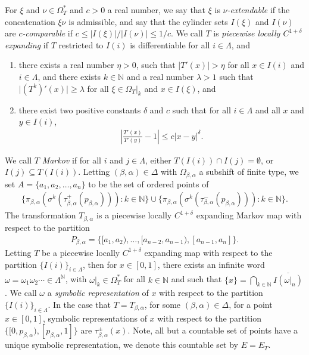 \documentclass[a4paper,reqno,10pt]{amsart}
\begin{document}
For $\xi$ and $\nu \in \Omega_{T}^{*}$ and $c > 0$ a real number, we say that $\xi$ is \textsl{$\nu$-extendable} if the concatenation $\xi\nu$ is admissible, and say that the cylinder sets $I(\xi)$ and $I(\nu)$ are \textsl{$c$-comparable} if $c \leq \lvert I(\xi) \rvert / \lvert I(\nu) \rvert \leq 1/c$. We call $T$ is \textsl{piecewise locally $C^{1+\delta}$ expanding} if $T$ restricted to $I(i)$ is differentiable for all $i \in \Lambda$, and
    \begin{enumerate}[label={\rm(\arabic*)}]
        \item there exists a real number $\eta > 0$, such that $\lvert T'(x) \rvert > \eta$ for all $x \in I(i)$ and $i \in \Lambda$, and there exists $k \in \mathbb{N}$ and a real number $\lambda > 1$ such that $\lvert (T^{k})'(x) \rvert \geq \lambda$ for all $\xi \in \Omega_{T}\vert_{k}$ and $x \in I(\xi)$, and
        \item there exist two positive constants $\delta$ and $c$ such that for all $i \in \Lambda$ and all $x$ and $y \in I(i)$,
            \begin{align*}
                \left\lvert \frac{T'(x)}{T'(y)} - 1 \right\rvert \leq c \lvert x - y \rvert^{\delta}. 
            \end{align*}
    \end{enumerate}
We call $T$ \textsl{Markov} if for all $i$ and $j \in \Lambda$, either $T(I(i)) \cap I(j) = \emptyset$, or $I(j) \subseteq T(I(i))$. Letting $(\beta, \alpha) \in \Delta$ with $\Omega_{\beta, \alpha}$ a subshift of finite type, we set $A = \{ a_{1}, a_{2}, \ldots, a_{n} \}$ to be the set of ordered points of 
    \begin{align*}
        \{ \pi_{\beta, \alpha}(\sigma^{k}(\tau_{\beta,\alpha}^{+}(p_{\beta, \alpha}))) \colon k \in \mathbb{N}\} \cup \{ \pi_{\beta, \alpha}(\sigma^{k}(\tau_{\beta,\alpha}^{-}(p_{\beta, \alpha}))) \colon k \in \mathbb{N} \}.
    \end{align*}
The transformation $T_{\beta, \alpha}$ is a piecewise locally $C^{1+\delta}$ expanding Markov map with respect to the partition 
    \begin{align}\label{eq:Markov_Partition}
        P_{\beta,\alpha} = \{[a_{1}, a_{2}), \ldots, [a_{n-2}, a_{n-1}), [a_{n-1}, a_{n}]\}.
    \end{align}
Letting $T$ be a piecewise locally $C^{1+\delta}$ expanding map with respect to the partition $\{ I(i) \}_{i \in \Lambda}$, then for $x \in [0, 1]$, there exists an infinite word $\omega = \omega_{1} \omega_{2} \cdots  \in \Lambda^{\mathbb{N}}$, with $\omega \vert_{k} \in \Omega_{T}^{*}$ for all $k \in \mathbb{N}$ and such that $\{ x \} = \bigcap_{k \in \mathbb{N}} \overline{I(\omega\vert_{n})}$. We call $\omega$ a \textsl{symbolic representation} of $x$ with respect to the partition $\{ I(i)\}_{i \in \Lambda}$.  In the case that $T = T_{\beta,\alpha}$, for some $(\beta,\alpha) \in \Delta$, for a point $x \in [0, 1]$, symbolic representations of $x$ with respect to the partition $\{ [0,p_{\beta, \alpha}), [p_{\beta,\alpha},1] \}$ are $\tau_{\beta, \alpha}^{\pm}(x)$.  Note, all but a countable set of points have a unique symbolic representation, we denote this countable set by $E = E_{T}$.
\end{document}
